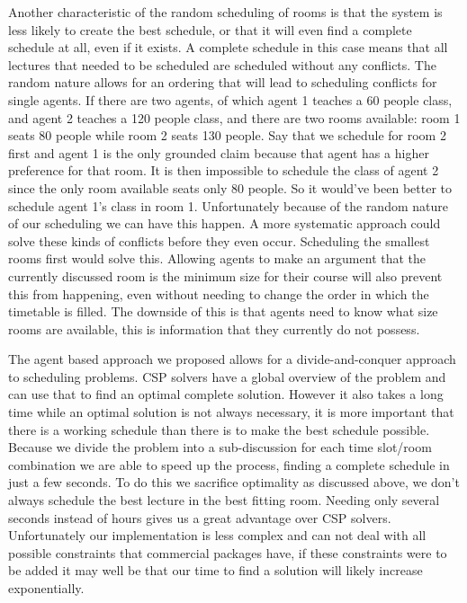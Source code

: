 Another characteristic of the random scheduling of rooms is that the system is
less likely to create the best schedule, or that it will even find a complete
schedule at all, even if it exists. A complete schedule in this case means that
all lectures that needed to be scheduled are scheduled without any conflicts.
The random nature allows for an ordering that will lead to scheduling conflicts
for single agents. If there are two agents, of which agent 1 teaches a 60 people
class, and agent 2 teaches a 120 people class, and there are two rooms
available: room 1 seats 80 people while room 2 seats 130 people. Say that we
schedule for room 2 first and agent 1 is the only grounded claim because that
agent has a higher preference for that room. It is then impossible to schedule
the class of agent 2 since the only room available seats only 80 people. So it
would've been better to schedule agent 1's class in room 1. Unfortunately
because of the random nature of our scheduling we can have this happen. A more
systematic approach could solve these kinds of conflicts before they even occur.
Scheduling the smallest rooms first would solve this. Allowing agents to make
an argument that the currently discussed room is the minimum size for their
course will also prevent this from happening, even without needing to change the
order in which the timetable is filled. The downside of this is that agents need
to know what size rooms are available, this is information that they currently
do not possess.

The agent based approach we proposed allows for a divide-and-conquer approach to
scheduling problems. CSP solvers have a global overview of the problem and can
use that to find an optimal complete solution. However it also takes a long time
while an optimal solution is not always necessary, it is more important that
there is a working schedule than there is to make the best schedule possible.
Because we divide the problem into a sub-discussion for each time slot/room
combination we are able to speed up the process, finding a complete schedule in
just a few seconds. To do this we sacrifice optimality as discussed above, we
don't always schedule the best lecture in the best fitting room. Needing only
several seconds instead of hours gives us a great advantage over CSP solvers.
Unfortunately our implementation is less complex and can not deal with all
possible constraints that commercial packages have, if these constraints were to
be added it may well be that our time to find a solution will likely increase
exponentially.

